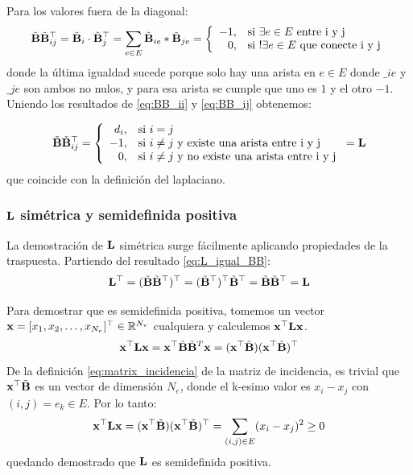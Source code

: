 \documentclass{article}
\begin{document}
Para los valores fuera de la diagonal:
\begin{equation}
    \label{eq:BB_ij}
    \tilde{\mathbf{B}}\tilde{\mathbf{B}}^\top_{ij} = \tilde{\mathbf{B}}_i\cdot\tilde{\mathbf{B}}_j^\top = \sum_{e\in E} \tilde{\mathbf{B}}_{ie} * \tilde{\mathbf{B}}_{je} = \left\lbrace
    \begin{array}{r l}
        -1, & \text{si $\exists e\in E$ entre i y j}         \\
        0,  & \text{si $!\exists e \in E$ que conecte i y j}
    \end{array}
    \right.
\end{equation}
donde la última igualdad sucede porque solo hay una arista en $e \in E$ donde
$\bm_{ie}$ y $\bm_{je}$ son ambos no nulos, y para esa arista se cumple que uno es
$1$ y el otro $-1$. Uniendo los resultados de \eqref{eq:BB_ii} y \eqref{eq:BB_ij} obtenemos:

\begin{equation}
    \label{eq:L_igual_BB}
    \tilde{\mathbf{B}}\tilde{\mathbf{B}}^\top_{ij} = \left\lbrace
    \begin{array}{r l}
        d_i, & \text{si $i=j$}                                        \\
        -1,  & \text{si $i\neq j$ y existe una arista entre i y j}    \\
        0,   & \text{si $i\neq j$ y no existe una arista entre i y j}
    \end{array}
    \right. = \mathbf{L}
\end{equation}
que coincide con la definición del laplaciano.

\subsubsection{$\mathbf{L}$ simétrica y semidefinida positiva}

La demostración de $\mathbf{L}$ simétrica surge fácilmente aplicando propiedades de la traspuesta. Partiendo del resultado \eqref{eq:L_igual_BB}:
\begin{equation}
    \mathbf{L}^\top = (\tilde{\mathbf{B}}\tilde{\mathbf{B}}^\top)^\top = (\tilde{\mathbf{B}}^\top)^\top \tilde{\mathbf{B}}^\top = \tilde{\mathbf{B}}\tilde{\mathbf{B}}^\top = \mathbf{L}
\end{equation}

Para demostrar que es semidefinida positiva, tomemos un vector $\mathbf{x} = [x_1, x_2, \dots, x_{N_v}]^\top \in \mathbb{R}^{N_v}$
cualquiera y calculemos $\mathbf{x}^\top\mathbf{L}\mathbf{x}$.
\begin{equation*}
    \mathbf{x}^\top\mathbf{L}\mathbf{x} = \mathbf{x}^\top \tilde{\mathbf{B}}\tilde{\mathbf{B}}^T\mathbf{x} = (\mathbf{x}^\top\tilde{\mathbf{B}})(\mathbf{x}^\top\tilde{\mathbf{B}})^\top
\end{equation*}
De la definición \eqref{eq:matrix_incidencia} de la matriz de incidencia, es trivial que $\mathbf{x}^\top \tilde{\mathbf{B}}$ es un vector de dimensión $N_e$, donde el k-esimo valor es $x_i-x_j$ con $(i,j) = e_k \in E$.  Por lo tanto:
\begin{equation}
    \mathbf{x}^\top\mathbf{L}\mathbf{x} = (\mathbf{x}^\top\tilde{\mathbf{B}})(\mathbf{x}^\top\tilde{\mathbf{B}})^\top = \sum_{(i,j)\in E} (x_i-x_j)^2 \geq 0
\end{equation}
quedando demostrado que $\mathbf{L}$ es semidefinida positiva.
\end{document}
